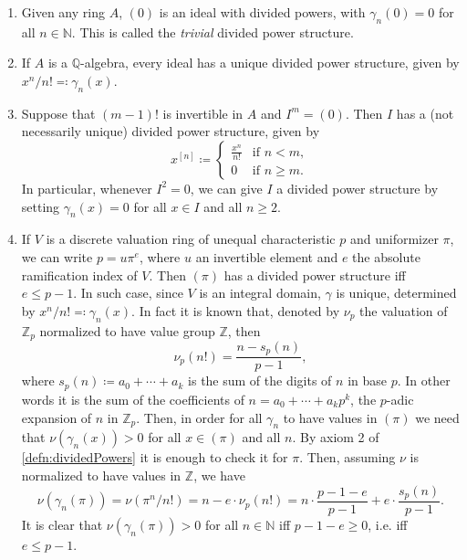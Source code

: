 \begin{ex}\leavevmode\vspace{-.2\baselineskip}
\begin{enumerate}\label{PDexamples}
	\item Given any ring $A$, $(0)$ is an ideal with divided powers,
		with $\gamma_n(0) = 0$ for all $n \in \mathbb{N}$.
		This is called the \emph{trivial} divided power structure.

	\item If $A$ is a $\mathbb{Q}$-algebra, every ideal has a unique
		divided power structure, given by $x^n/n! \eqqcolon \gamma_n(x)$.

	\item\label{PDEx:NilpotentIdeal} Suppose that $\left( m-1 \right)!$ is invertible in $A$ and 
		$I^m = (0)$.
		Then $I$ has a (not necessarily unique) divided power structure, given by
		\begin{equation*}
			x^{[n]} \coloneqq
			\begin{cases}
				\frac{ x^n }{ n! } & \text{if } n < m,\\
				0 & \text{if } n \geq m.
			\end{cases} 
		\end{equation*}
		In particular, whenever $I^2 = 0$, we can give $I$ a
		divided power structure by setting $\gamma_n(x) = 0$
		for all $x \in I$ and all $n \geq 2$.

	\item\label{PDex:DVR} If $V$ is a discrete valuation ring of unequal characteristic $p$
		and uniformizer $\pi$, we can write $p = u \pi^e$,
		where $u$ an invertible element and $e$ the absolute ramification
		index of $V$.
		Then $\left( \pi \right)$ has a divided power structure iff $e \leq p-1$.
		In such case, since \(V\) is an integral domain, 
		$\gamma$ is unique, determined by $x^n/n! \eqqcolon \gamma_n(x)$.
		In fact it is known that, denoted by $\nu_p$ the valuation
		of $\mathbb{Z}_{p}$ normalized to have value group $\mathbb{Z}$,
		then
		\begin{equation*}
			\nu_p(n!) = 
			\frac{n - s_p(n)}{p-1}
		,\end{equation*}
		where $s_p(n) \coloneqq a_0 + \cdots + a_k$ is the sum of the
		digits of $n$ in base $p$. In other words it is the
		sum of the coefficients of $n = a_0 + \cdots + a_kp^k$,
		the $p$-adic expansion of $n$ in $\mathbb{Z}_{p}$.
		Then, in order for all $\gamma_n$ to have values in $(\pi)$
		we need that $\nu(\gamma_n(x)) > 0$ for all $x \in (\pi)$ and all \(n\).
		By axiom 2 of \cref{defn:dividedPowers}
		it is enough to check it for $\pi$.
		Then, assuming $\nu$ is normalized to have values in $\mathbb{Z}$,
		we have
		\begin{equation*}
			\nu(\gamma_n(\pi)) = \nu(\pi^n/n!) =
			n - e \cdot \nu_p(n!) =
			n \cdot \frac{p - 1 - e}{p - 1} + e \cdot \frac{s_p(n)}{p - 1}
		.\end{equation*}
		It is clear that $\nu(\gamma_n(\pi)) > 0$ for all $n \in \mathbb{N}$
		iff $p - 1 - e \geq 0$, i.e. iff $e \leq p - 1$.
\end{enumerate}
\end{ex} 


